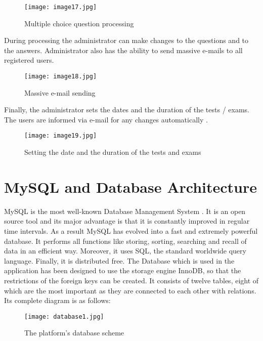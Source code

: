 \documentclass[10pt, conference, compsocconf]{IEEEtran}
\begin{document}
\begin{figure}[!h]
	\centering
	\texttt{[image: image17.jpg]}
	\caption{Multiple choice question processing}
\end{figure}
 
During processing the administrator can make changes to the questions and to the answers. Administrator also has the ability to send massive e-mails to all registered users.


\begin{figure}[!h]
	\centering
	\texttt{[image: image18.jpg]}
	\caption{Massive e-mail sending}
\end{figure}

Finally, the administrator sets the dates and the duration of the tests / exams. The users are informed via e-mail for any changes automatically .

\begin{figure}[!h]
	\centering
	\texttt{[image: image19.jpg]}
	\caption{Setting the date and the duration of the tests and exams}
\end{figure}










\section{MySQL and Database Architecture}

  
MySQL is the most well-known Database Management System \cite{mysql}. It is an open source tool and its major advantage is that it is constantly improved in regular time intervals. As a result MySQL has evolved into a fast and extremely powerful database. It performs all functions like storing, sorting, searching and recall of data in an efficient way. Moreover, it uses SQL, the standard worldwide query language. Finally, it is distributed free. The Database which is used in the application has been designed to use the storage engine InnoDB, so that the restrictions of the foreign keys can be created. It consists of twelve tables, eight of which are the most important as they are connected to each other with relations. Its complete diagram is as follows: 

\begin{figure}[!h]
	\centering
	\texttt{[image: database1.jpg]}
	\caption{The platform’s database scheme}
\end{figure}
\end{document}
